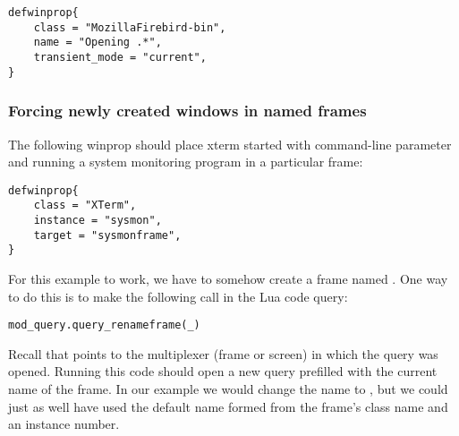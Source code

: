 \begin{verbatim}
defwinprop{
    class = "MozillaFirebird-bin",
    name = "Opening .*",
    transient_mode = "current",
}
\end{verbatim}

\subsubsection{Forcing newly created windows in named frames}

The following winprop should place xterm started with command-line parameter
\mbox{} and running a system monitoring program in a
particular frame:
\begin{verbatim}
defwinprop{
    class = "XTerm",
    instance = "sysmon",
    target = "sysmonframe",
}
\end{verbatim}

For this example to work, we have to somehow create a frame named
. One way to do this is to make the following
call in the  Lua code query:

\begin{verbatim}
mod_query.query_renameframe(_)
\end{verbatim}

Recall that \code{_} points to the multiplexer (frame or screen) in which 
the query was opened. Running this code should open a new query prefilled
with the current name of the frame. In our example we would change the 
name to , but we could just as well have used the 
default name formed from the frame's class name and an instance number.
